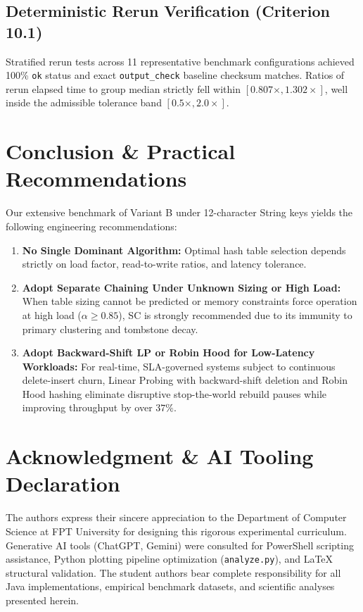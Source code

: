 \documentclass[twocolumn, 10pt, a4paper]{article}
\begin{document}
\subsection{Deterministic Rerun Verification (Criterion 10.1)}
Stratified rerun tests across 11 representative benchmark configurations achieved 100\% \texttt{ok} status and exact \texttt{output\_check} baseline checksum matches. Ratios of rerun elapsed time to group median strictly fell within $[0.807\times, 1.302\times]$, well inside the admissible tolerance band $[0.5\times, 2.0\times]$.

\section{Conclusion \& Practical Recommendations}
Our extensive benchmark of Variant B under 12-character String keys yields the following engineering recommendations:
\begin{enumerate}
    \item \textbf{No Single Dominant Algorithm:} Optimal hash table selection depends strictly on load factor, read-to-write ratios, and latency tolerance.
    \item \textbf{Adopt Separate Chaining Under Unknown Sizing or High Load:} When table sizing cannot be predicted or memory constraints force operation at high load ($\alpha \ge 0.85$), SC is strongly recommended due to its immunity to primary clustering and tombstone decay.
    \item \textbf{Adopt Backward-Shift LP or Robin Hood for Low-Latency Workloads:} For real-time, SLA-governed systems subject to continuous delete-insert churn, Linear Probing with backward-shift deletion and Robin Hood hashing eliminate disruptive stop-the-world rebuild pauses while improving throughput by over $37\%$.
\end{enumerate}

\section*{Acknowledgment \& AI Tooling Declaration}
The authors express their sincere appreciation to the Department of Computer Science at FPT University for designing this rigorous experimental curriculum. Generative AI tools (ChatGPT, Gemini) were consulted for PowerShell scripting assistance, Python plotting pipeline optimization (\texttt{analyze.py}), and LaTeX structural validation. The student authors bear complete responsibility for all Java implementations, empirical benchmark datasets, and scientific analyses presented herein.
\end{document}
